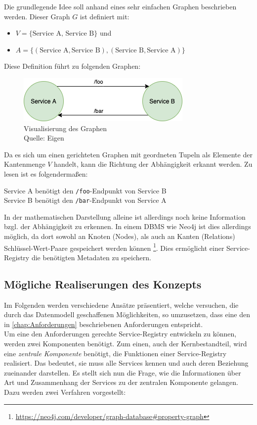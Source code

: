 Die grundlegende Idee soll anhand eines sehr einfachen Graphen beschrieben werden. Dieser Graph $G$ ist definiert mit:
\begin{itemize}
	\item $V = \{\text{Service A, Service B}\}$ und
	\item $A = \{(\text{Service A},\text{Service B}), (\text{Service B}, \text{Service A})\}$
\end{itemize}

Diese Definition führt zu folgenden Graphen:

\begin{figure}[h]
	\centering
	\includegraphics[width=0.65\linewidth]{img/service_dependencies.png}
	\caption[Abbildung eines simplen Abhängigkeitsgraphen]{Visualisierung des Graphen\\Quelle: Eigen}
\end{figure}

Da es sich um einen gerichteten Graphen mit geordneten Tupeln als Elemente der Kantenmenge $V$ handelt, kann die Richtung der Abhängigkeit erkannt werden. Zu lesen ist es folgendermaßen:

\begin{center}
	Service A benötigt den \texttt{/foo}-Endpunkt von Service B\\
	Service B benötigt den \texttt{/bar}-Endpunkt von Service A
\end{center}

In der mathematischen Darstellung alleine ist allerdings noch keine Information bzgl. der Abhängigkeit zu erkennen. In einem \ac{DBMS} wie Neo4j ist dies allerdings möglich, da dort sowohl an Knoten (Nodes), als auch an Kanten (Relations) Schlüssel-Wert-Paare gespeichert werden können \footnote{\url{https://neo4j.com/developer/graph-database\#property-graph}}. Dies ermöglicht einer Service-Registry die benötigten Metadaten zu speichern.

\subsection{Mögliche Realiserungen des Konzepts}

Im Folgenden werden verschiedene Ansätze präsentiert, welche versuchen, die durch das Datenmodell geschaffenen Möglichkeiten, so umzusetzen, dass eine den in \vref{chap:Anforderungen} beschriebenen Anforderungen entspricht.\\ Um eine den Anforderungen gerechte Service-Registry entwickeln zu können, werden zwei Komponenten benötigt. Zum einen, auch der Kernbestandteil, wird eine \textit{zentrale Komponente} benötigt, die Funktionen einer Service-Registry realisiert. Das bedeutet, sie muss alle Services kennen und auch deren Beziehung zueinander darstellen. Es stellt sich nun die Frage, wie die Informationen über Art und Zusammenhang der Services zu der zentralen Komponente gelangen. Dazu werden zwei Verfahren vorgestellt:

